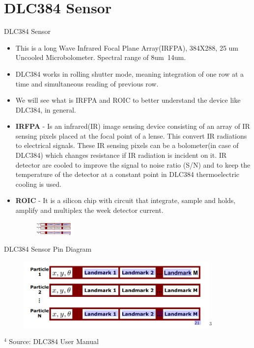 \documentclass{beamer}
\begin{document}
\section{DLC384 Sensor}
\begin{frame}{DLC384 Sensor}
    \begin{itemize}
        \item This is a long Wave Infrared Focal Plane Array(IRFPA), 384X288, 25 um Uncooled Microbolometer. Spectral range of 8um~14um.
        \item DLC384 works in rolling shutter mode, meaning integration of one row at a time and simultaneous reading of previous row.
        \item We will see what is IRFPA and ROIC to better understand the device like DLC384, in general.
        \item \textbf{IRFPA} - Is an infrared(IR) image sensing device consisting of an array of IR sensing pixels placed at the focal point of a lense. This convert IR radiations to electrical signals. These IR sensing pixels can be a bolometer(in case of DLC384) which changes resistance if IR radiation is incident on it. IR detector are cooled to improve the signal to noise ratio (S/N) and to keep the temperature of the detector at a constant point in DLC384 thermoelectric cooling is used.
        \item \textbf{ROIC} - It is a silicon chip with circuit that integrate, sample and holds, amplify and multiplex the week detector current. %
        \begin{figure}
            \hfil
            \hfil
            \includegraphics[width = 20mm]{RBPF_SLAM.png}
        \end{figure}
    \end{itemize}
\end{frame}


\begin{frame}{DLC384 Sensor Pin Diagram}
   \begin{figure}
            \centering
            \includegraphics[width=100mm]{RBPF_SLAM.png}$^{3}$
    \end{figure}
\vfill
\tiny{$^{4}$} Source: DLC384 User Manual
\end{frame}
\end{document}
